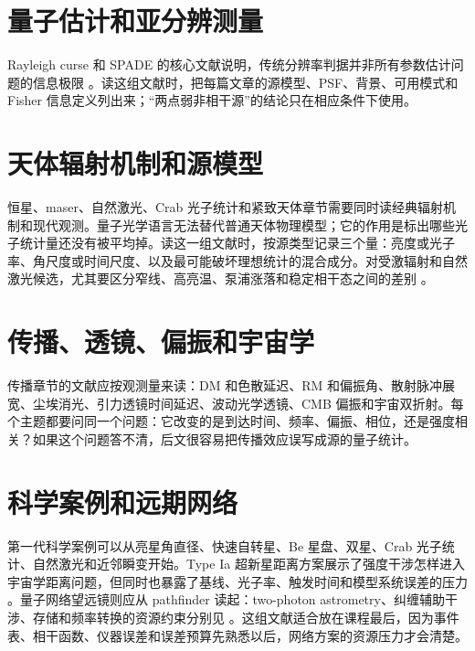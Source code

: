 \section{量子估计和亚分辨测量}
\label{appsec:g-estimation}

Rayleigh curse 和 SPADE 的核心文献说明，传统分辨率判据并非所有参数估计问题的信息极限 \citep{2015Optic...2..646T,2016PhRvX...6c1033T,2017PhRvL.118g0801T,2017NJPh...19b3054T}。读这组文献时，把每篇文章的源模型、PSF、背景、可用模式和 Fisher 信息定义列出来；“两点弱非相干源”的结论只在相应条件下使用。

\section{天体辐射机制和源模型}
\label{appsec:g-sources}

恒星、maser、自然激光、Crab 光子统计和紧致天体章节需要同时读经典辐射机制和现代观测。量子光学语言无法替代普通天体物理模型；它的作用是标出哪些光子统计量还没有被平均掉。读这一组文献时，按源类型记录三个量：亮度或光子率、角尺度或时间尺度、以及最可能破坏理想统计的混合成分。对受激辐射和自然激光候选，尤其要区分窄线、高亮温、泵浦涨落和稳定相干态之间的差别 \citep{1982RvMP...54.1225E,1992ARA&A..30...75E,2004A&A...428..497J,2005MNRAS.364..731J,2005NewA...10..361J,2008AIPC..984..216D}。

\section{传播、透镜、偏振和宇宙学}
\label{appsec:g-propagation}

传播章节的文献应按观测量来读：DM 和色散延迟、RM 和偏振角、散射脉冲展宽、尘埃消光、引力透镜时间延迟、波动光学透镜、CMB 偏振和宇宙双折射。每个主题都要问同一个问题：它改变的是到达时间、频率、偏振、相位，还是强度相关？如果这个问题答不清，后文很容易把传播效应误写成源的量子统计。

\section{科学案例和远期网络}
\label{appsec:g-cases}

第一代科学案例可以从亮星角直径、快速自转星、Be 星盘、双星、Crab 光子统计、自然激光和近邻瞬变开始。Type Ia 超新星距离方案展示了强度干涉怎样进入宇宙学距离问题，但同时也暴露了基线、光子率、触发时间和模型系统误差的压力 \citep{2025PhRvD.111h3047K}。量子网络望远镜则应从 pathfinder 读起：two-photon astrometry、纠缠辅助干涉、存储和频率转换的资源约束分别见 \citet{2023PhRvL.130p0801M,2025PhRvA.111d3701M,2025PhRvR...7d3278Z,2026PhRvA.113a2608P,2026Natur.651..326S}。这组文献适合放在课程最后，因为事件表、相干函数、仪器误差和误差预算先熟悉以后，网络方案的资源压力才会清楚。

